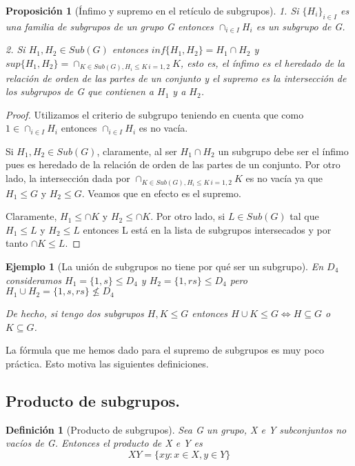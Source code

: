 \documentclass{article}
\theoremstyle{theorem-style}  %
\newtheorem{proposition}[theorem]{Proposición}
\theoremstyle{definition-style}
\newtheorem{definition}{Definición}[section]
\theoremstyle{example-style}
\newtheorem{example}{Ejemplo}[section]
\begin{document}
\begin{proposition}[Ínfimo y supremo en el retículo de subgrupos]
1. Si $\{H_i\}_{i \in I}$ es una familia de subgrupos de un grupo G entonces $\cap_{i \in I} H_i$ es un subgrupo de G.

2. Si $H_1,H_2 \in Sub(G)$ entonces $inf\{H_1,H_2\} = H_1 \cap H_2$ y $sup\{H_1,H_2\} = \cap_{K \in Sub(G), H_i \le K \, i = 1,2} K$, esto es, el ínfimo es el heredado de la relación de orden de las partes de un conjunto y el supremo es la intersección de los subgrupos de G que contienen a $H_1$ y a $H_2$.
\end{proposition}

\begin{proof}
Utilizamos el criterio de subgrupo teniendo en cuenta que como $ 1 \in \cap_{i \in I} H_i$ entonces $\cap_{i \in I} H_i$ es no vacía.

Si $H_1,H_2 \in Sub(G)$, claramente, al ser $H_1 \cap H_2$ un subgrupo debe ser el ínfimo pues es heredado de la relación de orden de las partes de un conjunto. Por otro lado, la intersección dada por $\cap_{K \in Sub(G), H_i \le K \, i = 1,2} K$ es no vacía ya que $H_1 \le G$ y $H_2 \le G$. Veamos que en efecto es el supremo.

Claramente, $H_1 \le \cap K$ y $H_2 \le \cap K$. Por otro lado, si $L \in Sub(G)$ tal que $H_1 \le L$ y $H_2 \le L$ entonces L está en la lista de subgrupos intersecados y por tanto $\cap K \le L$.
\end{proof}

\begin{example}[La unión de subgrupos no tiene por qué ser un subgrupo]
En $D_4$ consideramos $H_1 = \{1,s\} \le D_4$ y $H_2 = \{1,rs\} \le D_4$ pero 
$H_1 \cup H_2 = \{1,s,rs\} \nleq D_4$

De hecho, si tengo dos subgrupos $H,K \le G$ entonces $H \cup K \le G \iff H \subseteq G$ o $K \subseteq G$.
\end{example}

La fórmula que me hemos dado para el supremo de subgrupos es muy poco práctica. Esto motiva las siguientes definiciones.

\subsection{Producto de subgrupos.}

\begin{definition}[Producto de subgrupos]
Sea G un grupo, X e Y subconjuntos no vacíos de G. Entonces el producto de X e Y es
$$XY = \{xy:x \in X,y \in Y\}$$
\end{definition}
\end{document}
